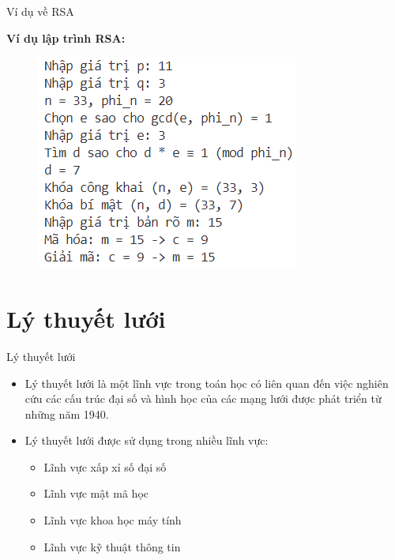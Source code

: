 \documentclass{beamer}
\begin{document}
\begin{frame}{Ví dụ về RSA}

\textbf{Ví dụ lập trình RSA:}

\begin{figure}[H]
\centering
\includegraphics[scale = 0.9]{pictures/lap_trinh_vi_du_RSA.png}
\end{figure}

\end{frame}
\section{Lý thuyết lưới}
\begin{frame}{Lý thuyết lưới}
\begin{itemize}
\item Lý thuyết lưới là một lĩnh vực trong toán học có liên quan đến việc nghiên cứu các cấu trúc đại số và hình học của các mạng lưới được phát triển từ những năm 1940.
\item Lý thuyết lưới được sử dụng trong nhiều lĩnh vực:
\begin{itemize}
\item Lĩnh vực xấp xỉ số đại số
\item Lĩnh vực mật mã học
\item Lĩnh vực khoa học máy tính
\item Lĩnh vực kỹ thuật thông tin
\end{itemize}
\end{itemize}
\end{frame}
\end{document}
